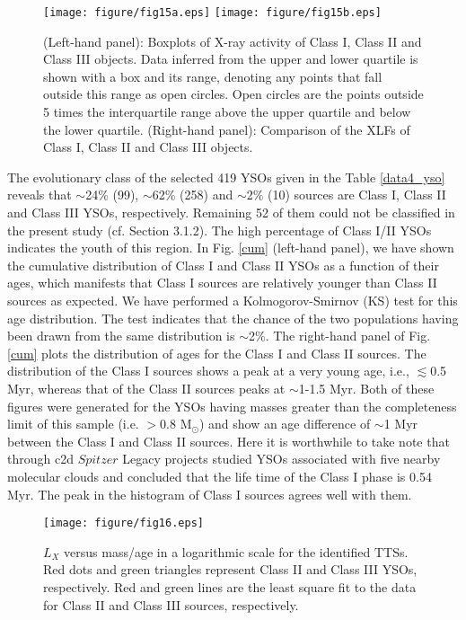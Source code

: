 \documentclass[a4paper,fleqn,usenatbib,useAMS]{mnras}
\begin{document}
\begin{figure*}
\texttt{[image: figure/fig15a.eps]}
\texttt{[image: figure/fig15b.eps]}
\caption{(Left-hand panel): Boxplots of X-ray activity of Class I, Class II and Class III objects.
Data inferred from the upper and lower quartile is shown with a box and its range, denoting any points that fall outside this range as open circles. 
Open circles are the points outside 5 times the interquartile range above the upper quartile and below the lower quartile.
(Right-hand panel): Comparison of the XLFs of Class I, Class II and Class III objects. 
}
\label{fig:compare1}
\end{figure*}

The evolutionary class of the  selected 419 YSOs given in the Table \ref {data4_yso} reveals that
$\sim$24\% (99), $\sim$62\% (258) and $\sim$2\% (10) sources are Class I, Class II and Class III YSOs, respectively.
Remaining 52 of them could not be classified in the present study (cf. Section 3.1.2). 
The high percentage of Class I/II YSOs indicates the youth of this region.
In Fig. \ref{cum} (left-hand panel), we have shown the cumulative distribution of Class I and Class II YSOs as a function
of their ages, which manifests that Class I sources are relatively younger than Class II sources as expected. We have performed
a  Kolmogorov-Smirnov (KS) test for this age distribution. The test indicates 
that the chance of the two populations having been drawn from the same distribution is $\sim$2\%. 
The right-hand panel of Fig. \ref{cum}  plots the distribution of ages for the Class I and Class II sources.
The distribution of the Class I sources shows a peak at a very young age, i.e., $\lesssim$0.5 Myr, whereas that
of the Class II sources peaks at $\sim$1-1.5 Myr. 
Both of these figures were generated for the YSOs having masses greater than the completeness limit 
of this sample (i.e. $>$0.8 M$_\odot$) and show 
an age difference of $\sim$1 Myr between the Class I and Class II sources.
 Here it is worthwhile to take note that \citet{2009ApJS..181..321E} through c2d $Spitzer$ Legacy projects studied YSOs
associated with five nearby molecular clouds and concluded that the life time of the Class I phase is 0.54 Myr.
The peak in the histogram of Class I sources agrees well with them.

\begin{figure*}
\texttt{[image: figure/fig16.eps]}
\caption{
$L_X$  versus mass/age in a logarithmic scale for the identified TTSs.
Red dots and green triangles represent Class II  and Class III YSOs, respectively.
Red and green lines are the least square fit to the data for Class II and Class III sources, respectively.
}
\label{fig:compare2}
\end{figure*}
\end{document}
